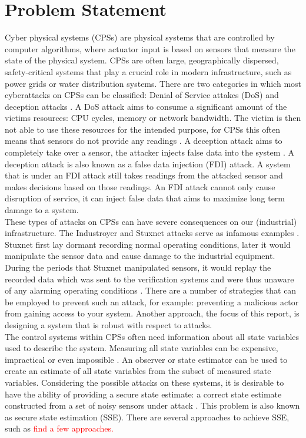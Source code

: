 \section{Problem Statement}
Cyber physical systems (CPSs) are physical systems that are controlled by computer algorithms, where actuator input is based on sensors that measure the state of the physical system. CPSs are often large, geographically dispersed, safety-critical systems that play a crucial role in modern infrastructure, such as power grids or water distribution systems. There are two categories in which most cyberattacks on CPSs can be classified: Denial of Service attakcs (DoS) and deception attacks \cite{Ding2021SecureSurvey}. A DoS attack aims to consume a significant amount of the victims resources: CPU cycles, memory or network bandwidth. The victim is then not able to use these resources for the intended purpose, for CPSs this often means that sensors do not provide any readings \cite{Yu2014AnAttacks}. A deception attack aims to completely take over a sensor, the attacker injects false data into the system \cite{Serpanos2022FalseSystems}. A deception attack is also known as a false data injection (FDI) attack. A system that is under an FDI attack still takes readings from the attacked sensor and makes decisions based on those readings. An FDI attack cannot only cause disruption of service, it can inject false data that aims to maximize long term damage to a system. \\ 

These types of attacks on CPSs can have severe consequences on our (industrial) infrastructure. The Industroyer and Stuxnet attacks serve as infamous examples \cite{Lameiras2022Industroyer:Grid}\cite{Kushner2013TheStuxnet}. Stuxnet first lay dormant recording normal operating conditions, later it would manipulate the sensor data and cause damage to the industrial equipment. During the periods that Stuxnet manipulated sensors, it would replay the recorded data which was sent to the verification systems and were thus unaware of any alarming operating conditions \cite{Fidler2011Was_Stuxnet_an_Act_of_War_Decoding_a_Cyberattack}. There are a number of strategies that can be employed to prevent such an attack, for example: preventing a malicious actor from gaining access to your system. Another approach, the focus of this report, is designing a system that is robust with respect to attacks. \\

The control systems within CPSs often need information about all state variables used to describe the system. Measuring all state variables can be expensive, impractical or even impossible \cite{yappa}. An observer or state estimator can be used to create an estimate of all state variables from the subset of measured state variables. Considering the possible attacks on these systems, it is desirable to have the ability of providing a secure state estimate: a correct state estimate constructed from a set of noisy sensors under attack \cite{ShoukrySecureApproach}. This problem is also known as secure state estimation (SSE). There are several approaches to achieve SSE, such as \textcolor{red}{find a few approaches.}

